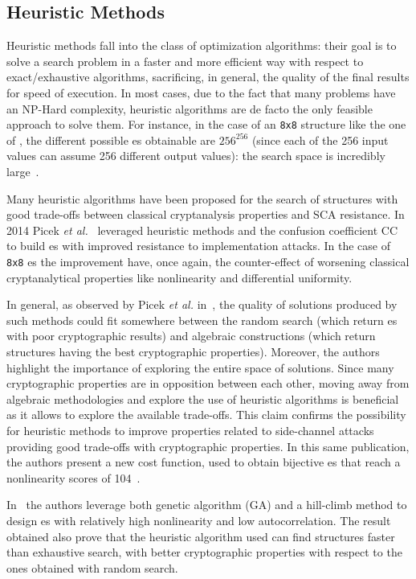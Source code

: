     \subsection{Heuristic Methods}
        Heuristic methods fall into the class of optimization algorithms: their goal is to solve a search problem in a faster and more efficient way with respect to exact/exhaustive algorithms, sacrificing, in general, the quality of the final results for speed of execution. In most cases, due to the fact that many problems have an NP-Hard complexity, heuristic algorithms are de facto the only feasible approach to solve them. For instance, in the case of an \texttt{8x8} \sbocs{} structure like the one of \aes{}, the different possible \sbocs{}es obtainable are $256^{256}$ (since each of the 256 input values can assume 256 different output values): the search space is incredibly large~\cite{clark2005design}.
        
        Many heuristic algorithms have been proposed for the search of \sbocs{} structures with good trade-offs between classical cryptanalysis properties and SCA resistance. In 2014 Picek \emph{et al.}~\cite{picek2014confused} leveraged heuristic methods and the confusion coefficient CC to build \sbocs{}es with improved resistance to implementation attacks. In the case of \texttt{8x8} \sbocs{}es the improvement have, once again, the counter-effect of worsening classical cryptanalytical properties like nonlinearity and differential uniformity.

        In general, as observed by Picek \emph{et al.} in~\cite{picek2016new}, the quality of solutions produced by such methods could fit somewhere between the random search (which return \sbocs{}es with poor cryptographic results) and algebraic constructions (which return structures having the best cryptographic properties). Moreover, the authors highlight the importance of exploring the entire space of solutions. Since many cryptographic properties are in opposition between each other, moving away from algebraic methodologies and explore the use of heuristic algorithms is beneficial as it allows to explore the available trade-offs. This claim confirms the possibility for heuristic methods to improve properties related to side-channel attacks providing good trade-offs with cryptographic properties. In this same publication, the authors present a new cost function, used to obtain bijective \sbocs{}es that reach a nonlinearity scores of 104~\cite{picek2016new}.
        
        In~\cite{millan1999evolutionary} the authors leverage both genetic algorithm (GA) and a hill-climb method to design \sbocs{}es with relatively high nonlinearity and low autocorrelation. The result obtained also prove that the heuristic algorithm used can find \sbocs{} structures faster than exhaustive search, with better cryptographic properties with respect to the ones obtained with random search.

